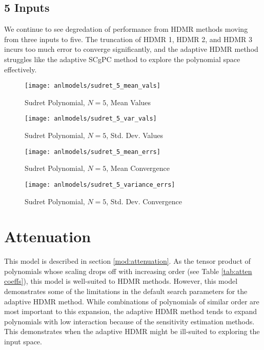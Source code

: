 \subsection{5 Inputs}
We continue to see degredation of performance from HDMR methods moving from three inputs to five.  The
truncation of HDMR 1, HDMR 2, and HDMR 3 incurs too much error to converge significantly, and the adaptive
HDMR method struggles like the adaptive SCgPC method to explore the polynomial space effectively.  
\begin{figure}[H]
  \centering
  \texttt{[image: anlmodels/sudret\_5\_mean\_vals]}
  \caption{Sudret Polynomial, $N=5$, Mean Values}
  \label{fig:hdmr sudretpoly mean values 5}
\end{figure}
\begin{figure}[H]
  \centering
  \texttt{[image: anlmodels/sudret\_5\_var\_vals]}
  \caption{Sudret Polynomial, $N=5$, Std. Dev. Values}
  \label{fig:hdmr sudretpoly var values 5}
\end{figure}

\begin{figure}[H]
  \centering
  \texttt{[image: anlmodels/sudret\_5\_mean\_errs]}
  \caption{Sudret Polynomial, $N=5$, Mean Convergence}
  \label{fig:hdmr sudretpoly mean errors 5}
\end{figure}
\begin{figure}[H]
  \centering
  \texttt{[image: anlmodels/sudret\_5\_variance\_errs]}
  \caption{Sudret Polynomial, $N=5$, Std. Dev. Convergence}
  \label{fig:hdmr sudretpoly var errors 5}
\end{figure}


\section{Attenuation}
This model is described in section \ref{mod:attenuation}.  As the tensor product of polynomials whose scaling
drops off with increasing order (see Table \ref{tab:atten coeffs}), this model is well-suited to HDMR methods.
However, this model demonstrates some of the limitations in the default search parameters for the adaptive
HDMR method.  While combinations of polynomials of similar order are most important to this expansion, the
adaptive HDMR method tends to expand polynomials with low interaction because of the sensitivity estimation
methods.  This demonstrates when the adaptive HDMR might be ill-suited to exploring the input space.

